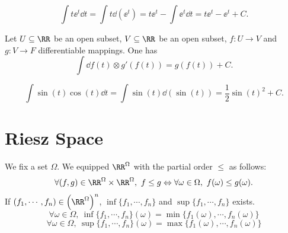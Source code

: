\begin{exampleenv}
    $$ \int t\ee^{t} \dd t=\int  t\dd(\ee^t)= t\ee^t-\int \ee^t \dd t=t \ee^t-\ee^t+C.$$
\end{exampleenv}
\begin{propositionenv}
    Let $U\subseteq\RR$ be an open subset, $V\subseteq\RR$ be an open subset, $f: U\longrightarrow V$ and $g: V\longrightarrow F$ differentiable mappings. One has 
    $$ \int \dd f(t) \otimes g'(f(t)) =g(f(t))+C.$$
\end{propositionenv}
\begin{exampleenv}
    $$ \int \sin (t)\cos (t)\dd t= \int \sin(t)\dd(\sin(t))=\frac{1}{2}\sin(t)^2+C.$$
\end{exampleenv}

\section{Riesz Space}
We fix a set $\Omega$. We equipped $\RR^\Omega$ with the partial order $\le $ as follows:
$$\forall (f,g)\in \RR^\Omega\times \RR^\Omega,\ f\le g \Leftrightarrow \forall \omega\in \Omega,\ f(\omega)\le g(\omega).$$
If $(f_1,\cdots,f_n)\in \left(\RR^\Omega\right)^n$, $\inf\{f_1,\cdots,f_n\}$ and $\sup\{f_1,\cdots,f_n\}$ exists.
$$ \forall \omega\in \Omega,\ \inf\{f_1,\cdots,f_n\}(\omega)=\min\{f_1(\omega),\cdots,f_n(\omega)\}$$
$$ \forall \omega\in \Omega,\ \sup\{f_1,\cdots,f_n\}(\omega)=\max\{f_1(\omega),\cdots,f_n(\omega)\}$$

